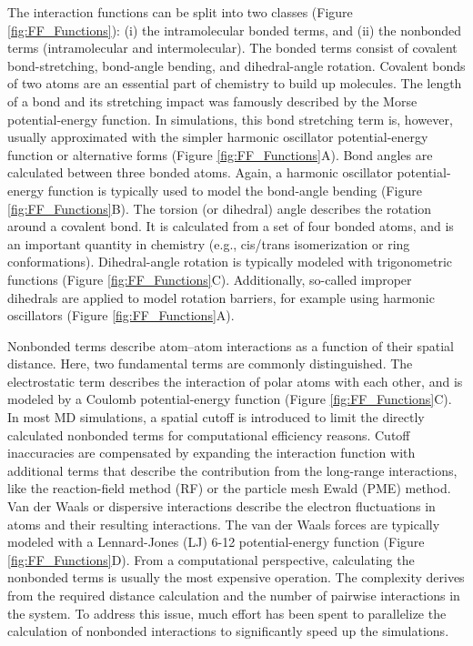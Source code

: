 The interaction functions can be split into two classes (Figure \ref{fig:FF_Functions}): (i) the intramolecular bonded terms, and (ii) the nonbonded terms (intramolecular and intermolecular).\cite{Weiner1984, Riniker2018}
The bonded terms consist of covalent bond-stretching, bond-angle bending, and dihedral-angle rotation.
Covalent bonds of two atoms are an essential part of chemistry to build up molecules. \cite{Pauling1934} The length of a bond and its stretching impact was famously described by the Morse potential-energy function. \cite{Morse1929, Iozzi2009} In simulations, this bond stretching term is, however, usually approximated with the simpler harmonic oscillator potential-energy function or alternative forms (Figure \ref{fig:FF_Functions}A).\cite{Gunsteren1996} Bond angles are calculated between three bonded atoms. 
Again, a harmonic oscillator potential-energy function is typically used to model the bond-angle bending (Figure \ref{fig:FF_Functions}B). 
The torsion (or dihedral) angle describes the rotation around a covalent bond. \cite{Blondel1996} It is calculated from a set of four bonded atoms, and is an important quantity in chemistry (e.g., cis/trans isomerization \cite{Dugave2003} or ring conformations\cite{Strauss1970}). Dihedral-angle rotation is typically modeled with trigonometric functions (Figure \ref{fig:FF_Functions}C).
Additionally, so-called improper dihedrals are applied to model rotation barriers, for example using harmonic oscillators (Figure \ref{fig:FF_Functions}A).\cite{Blondel1996}

Nonbonded terms describe atom--atom interactions as a function of their spatial distance. Here, two fundamental terms are commonly distinguished.
The electrostatic term describes the interaction of polar atoms with each other, and is modeled by a Coulomb potential-energy function (Figure \ref{fig:FF_Functions}C). \cite{Gillmor2017, Atkins2014} In most MD simulations, a spatial cutoff is introduced to limit the directly calculated nonbonded terms for computational efficiency reasons. Cutoff inaccuracies are compensated by expanding the interaction function with additional terms that describe the contribution from the long-range interactions, like the reaction-field method (RF) \cite{Tironi1995} or the particle mesh Ewald (PME) \cite{Darden1993} method.
Van der Waals or dispersive interactions describe the electron fluctuations in atoms and their resulting interactions.\cite{Kawai2016, Margenau1939} The van der Waals forces \cite{Margenau1939} are typically modeled with a Lennard-Jones (LJ)\cite{Jones1924} 6-12 potential-energy function (Figure \ref{fig:FF_Functions}D).
From a computational perspective, calculating the nonbonded terms is usually the most expensive operation. The complexity derives from the required distance calculation and the number of pairwise interactions in the system. To address this issue, much effort has been spent to parallelize the calculation of nonbonded interactions to significantly speed up the simulations.\cite{Berendsen1995, Schmid2012, Eastman2010, Meel2008}

